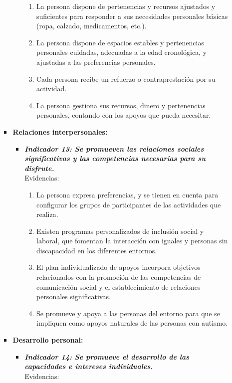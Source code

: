 \begin{itemize}
\begin{itemize}
\begin{itemize}
\begin{itemize}
				\begin{enumerate}
					\item La persona dispone de pertenencias y recursos ajustados y suficientes para responder a sus necesidades personales básicas (ropa, calzado, medicamentos, etc.). 
					\item La persona dispone de espacios estables y pertenencias personales cuidadas, adecuadas a la edad cronológica, y ajustadas a las preferencias personales. 
					\item Cada persona recibe un refuerzo o contraprestación por su actividad. 
					\item La persona gestiona sus recursos, dinero y pertenencias personales, contando con los apoyos que pueda necesitar. 
					
				\end{enumerate}
			\end{itemize}
			\item \textbf{Relaciones interpersonales:}
			\begin{itemize}
				\item \textbf{\textit{Indicador 13: Se promueven las relaciones sociales significativas y las competencias necesarias para su disfrute.}}\\Evidencias:
				
				\begin{enumerate}
					\item La persona expresa preferencias, y se tienen en cuenta para configurar los grupos de participantes de las actividades que realiza. 
					\item Existen programas personalizados de inclusión social y laboral, que fomentan la interacción con iguales y personas sin discapacidad en los diferentes entornos. 
					\item El plan individualizado de apoyos incorpora objetivos relacionados con la promoción de las competencias de comunicación social y el establecimiento de relaciones personales significativas. 
					\item Se promueve y apoya a las personas del entorno para que se impliquen como apoyos naturales de las personas con autismo. 
				\end{enumerate}
			\end{itemize}
			\item \textbf{Desarrollo personal:}
			\begin{itemize}
				\item \textbf{\textit{Indicador 14: Se promueve el desarrollo de las capacidades e intereses individuales.}}\\Evidencias:
				

\end{itemize}
\end{itemize}
\end{itemize}
\end{itemize}
